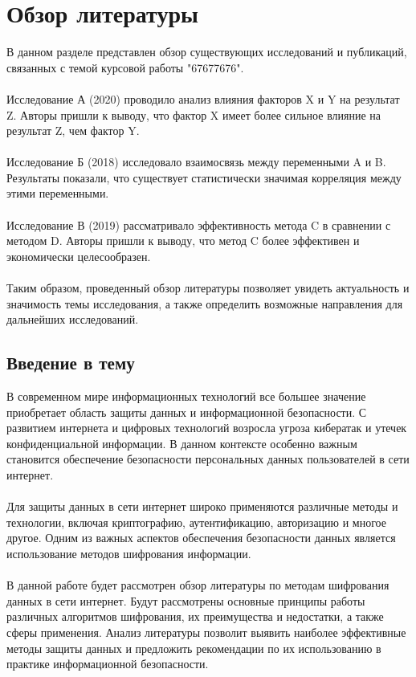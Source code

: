 \documentclass{article}
\begin{document}
\section{Обзор литературы}
В данном разделе представлен обзор существующих исследований и публикаций, связанных с темой курсовой работы "{}67677676"{}.\\
~\\
Исследование А (2020) проводило анализ влияния факторов X и Y на результат Z. Авторы пришли к выводу, что фактор X имеет более сильное влияние на результат Z, чем фактор Y.\\
~\\
Исследование Б (2018) исследовало взаимосвязь между переменными A и B. Результаты показали, что существует статистически значимая корреляция между этими переменными.\\
~\\
Исследование В (2019) рассматривало эффективность метода C в сравнении с методом D. Авторы пришли к выводу, что метод C более эффективен и экономически целесообразен.\\
~\\
Таким образом, проведенный обзор литературы позволяет увидеть актуальность и значимость темы исследования, а также определить возможные направления для дальнейших исследований.
\subsection{Введение в тему}
В современном мире информационных технологий все большее значение приобретает область защиты данных и информационной безопасности. С развитием интернета и цифровых технологий возросла угроза кибератак и утечек конфиденциальной информации. В данном контексте особенно важным становится обеспечение безопасности персональных данных пользователей в сети интернет.\\
~\\
Для защиты данных в сети интернет широко применяются различные методы и технологии, включая криптографию, аутентификацию, авторизацию и многое другое. Одним из важных аспектов обеспечения безопасности данных является использование методов шифрования информации.\\
~\\
В данной работе будет рассмотрен обзор литературы по методам шифрования данных в сети интернет. Будут рассмотрены основные принципы работы различных алгоритмов шифрования, их преимущества и недостатки, а также сферы применения. Анализ литературы позволит выявить наиболее эффективные методы защиты данных и предложить рекомендации по их использованию в практике информационной безопасности.
\end{document}
